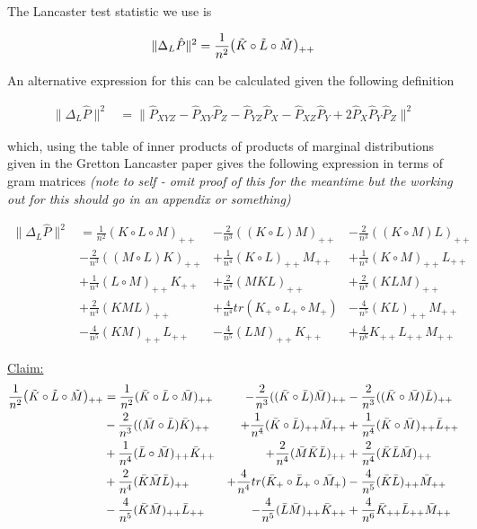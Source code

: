 \documentclass{article}
\newenvironment{claim}[1]{\par\noindent\underline{Claim:}\space#1}{}
\begin{document}
The Lancaster test statistic we use is

\begin{align*}
\|\Delta_L \hat{P}\|^2 = \frac{1}{n^2}\mathlarger{(}\tilde{K}\circ\tilde{L}\circ\tilde{M}\mathlarger{)}_{++}
\end{align*}

An alternative expression for this can be calculated given the following definition

\begin{align*}
\|\Delta_L \hat{P}\|^2 & = \|\hat{P}_{XYZ}-\hat{P}_{XY}\hat{P}_{Z} -\hat{P}_{YZ}\hat{P}_{X} - \hat{P}_{XZ}\hat{P}_{Y} + 2\hat{P}_X\hat{P}_Y\hat{P}_Z \|^2 
\end{align*}

which, using the table of inner products of products of marginal distributions given in the Gretton Lancaster paper gives the following expression in terms of gram matrices \emph{(note to self - omit proof of this for the meantime but the working out for this should go in an appendix or something)}

\begin{align*}
\|\Delta_L \hat{P}\|^2 &= \frac{1}{n^2}(K \circ L\circ M)_{++} &-
\frac{2}{n^3}((K\circ L) M)_{++} & - 
\frac{2}{n^3}((K \circ M) L)_{++} \\&- 
\frac{2}{n^3}((M \circ L) K)_{++} &+ 
\frac{1}{n^4}(K \circ L)_{++} M_{++} &+ 
\frac{1}{n^4}(K \circ M)_{++} L_{++} \\&+ 
\frac{1}{n^4}(L \circ M)_{++} K_{++} &+ 
\frac{2}{n^4}(MKL)_{++} &+ 
\frac{2}{n^4}(KLM)_{++} \\&+ 
\frac{2}{n^4}(KML)_{++} &+ 
\frac{4}{n^4}tr(K_+ \circ L_+ \circ M_+) &-
\frac{4}{n^5}(K L)_{++} M_{++} \\& - 
\frac{4}{n^5}(KM)_{++}L_{++} &- 
\frac{4}{n^5}(LM)_{++} K_{++} &+
\frac{4}{n^6}K_{++} L_{++} M_{++}
\end{align*}

\begin{claim}
\begin{align*}
\frac{1}{n^2}\mathlarger{(}\tilde{K}\circ\tilde{L}\circ\tilde{M}\mathlarger{)}_{++} &= \frac{1}{n^2}(\bar{K} \circ \bar{L}\circ \bar{M})_{++} &-
\frac{2}{n^3}((\bar{K}\circ \bar{L}) \bar{M})_{++} & - 
\frac{2}{n^3}((\bar{K} \circ \bar{M}) \bar{L})_{++} \\&- 
\frac{2}{n^3}((\bar{M} \circ \bar{L}) \bar{K})_{++} &+ 
\frac{1}{n^4}(\bar{K} \circ \bar{L})_{++} \bar{M}_{++} &+ 
\frac{1}{n^4}(\bar{K} \circ \bar{M})_{++} \bar{L}_{++} \\&+ 
\frac{1}{n^4}(\bar{L} \circ \bar{M})_{++} \bar{K}_{++} &+ 
\frac{2}{n^4}(\bar{M}\bar{K}\bar{L})_{++} &+ 
\frac{2}{n^4}(\bar{K}\bar{L}\bar{M})_{++} \\&+ 
\frac{2}{n^4}(\bar{K}\bar{M}\bar{L})_{++} &+ 
\frac{4}{n^4}tr(\bar{K}_+ \circ \bar{L}_+ \circ \bar{M}_+) &-
\frac{4}{n^5}(\bar{K} \bar{L})_{++} \bar{M}_{++} \\& - 
\frac{4}{n^5}(\bar{K}\bar{M})_{++}\bar{L}_{++} &- 
\frac{4}{n^5}(\bar{L}\bar{M})_{++} \bar{K}_{++} &+
\frac{4}{n^6}\bar{K}_{++} \bar{L}_{++} \bar{M}_{++}
\end{align*}
\end{claim}
\end{document}
